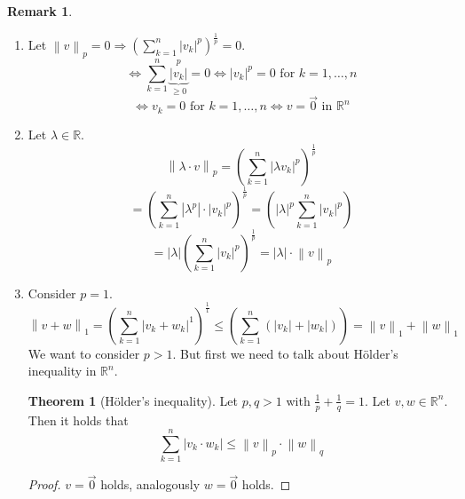 \documentclass[a4paper,landscape,twocolumn]{article}
\theoremstyle{definition}
\newtheorem{theorem}{Theorem}
\newtheorem{rem}{Remark}
\newcommand\abs[1]{\left|#1\right|}
\newcommand\norm[1]{\left\|#1\right\|}
\begin{document}
\begin{rem}
  \begin{enumerate}
    \item
      Let $\norm{v}_p = 0 \Rightarrow \left(\sum_{k=1}^{n} \abs{v_k}^p\right)^{\frac{1}{p}} = 0$.
      \[ \Leftrightarrow \sum_{k=1}^n \underbrace{\abs{v_k}}_{\geq 0}^p = 0 \Leftrightarrow \abs{v_k}^p = 0 \text{ for } k = 1, \ldots, n \]
      \[ \Leftrightarrow v_k = 0 \text{ for } k = 1, \ldots, n \iff v = \vec{0} \text{ in } \mathbb R^n \]
    \item
      Let $\lambda \in \mathbb R$.
      \[ \norm{\lambda \cdot v}_p = \left(\sum_{k=1}^n \abs{\lambda v_k}^p\right)^{\frac1p} \]
      \[ = \left(\sum_{k=1}^n \abs{\lambda^p} \cdot \abs{v_k}^p\right)^{\frac1p} = \left(\abs{\lambda}^p \sum_{k=1}^n \abs{v_k}^p\right) \]
      \[ = \abs{\lambda} \left(\sum_{k=1}^n \abs{v_k}^p\right)^{\frac1p} = \abs{\lambda} \cdot \norm{v}_p \]
    \item
      Consider $p = 1$.
      \[ \norm{v + w}_1
        = \left(\sum_{k=1}^n \abs{v_k + w_k}^1\right)^{\frac{1}{1}}
        \leq \left(\sum_{k=1}^n \left(\abs{v_k} + \abs{w_k}\right)\right)
        = \norm{v}_1 + \norm{w}_1
      \]
      We want to consider $p > 1$. But first we need to talk about Hölder's inequality in $\mathbb R^n$.
      \begin{theorem}[Hölder's inequality]
        Let $p, q > 1$ with $\frac1p + \frac1q = 1$.
        Let $v, w \in \mathbb R^n$. Then it holds that
        \[ \sum_{k=1}^n \abs{v_k \cdot w_k} \leq \norm{v}_p \cdot \norm{w}_q \]
      \end{theorem}
      \begin{proof}
        $v = \vec{0}$ holds, analogously $w = \vec{0}$ holds.


\end{proof}
\end{enumerate}
\end{rem}
\end{document}
